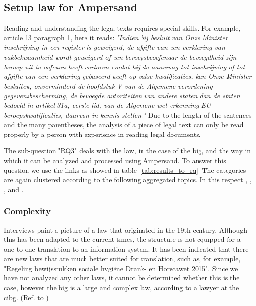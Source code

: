 \subsection{Setup law for Ampersand}\label{subsection:setup-law-for-ampersand}
Reading and understanding the legal texts requires special skills.
For example, article 13 paragraph 1, here it reads:
\textit{"Indien bij besluit van Onze Minister inschrijving in een register is geweigerd, de afgifte van een verklaring van vakbekwaamheid wordt geweigerd of een beroepsbeoefenaar de bevoegdheid zijn beroep uit te oefenen heeft verloren omdat hij de aanvraag tot inschrijving of tot afgifte van een verklaring gebaseerd heeft op valse kwalificaties, kan Onze Minister besluiten, onverminderd de hoofdstuk V van de Algemene verordening gegevensbescherming, de bevoegde autoriteiten van andere staten dan de staten bedoeld in artikel 31a, eerste lid, van de Algemene wet erkenning EU-beroepskwalificaties, daarvan in kennis stellen."}
Due to the length of the sentences and the many parentheses, the analysis of a piece of legal text can only be read properly by a person with experience in reading legal documents.

The sub-question "\acrlong{RQ3}" deals with the law, in the case of the \acrshort{big}, and the way in which it can be analyzed and processed using Ampersand.
To answer this question we use the links as showed in table~\ref{tab:results_to_rq}.
The categories are again clustered according to the following aggregated topics. In this respect , , ,  and .

\subsubsection{Complexity}\label{subsub:3_complexity}
Interviews paint a picture of a law that originated in the 19th century.
Although this has been adapted to the current times, the structure is not equipped for a one-to-one translation to an information system.
It has been indicated that there are new laws that are much better suited for translation, such as, for example, "Regeling bewijsstukken sociale hygiëne Drank- en Horecawet 2015".
Since we have not analyzed any other laws, it cannot be determined whether this is the case, however the \acrshort{big} is a large and complex law, according to a lawyer at the \acrshort{cibg}.
(Ref. to )

